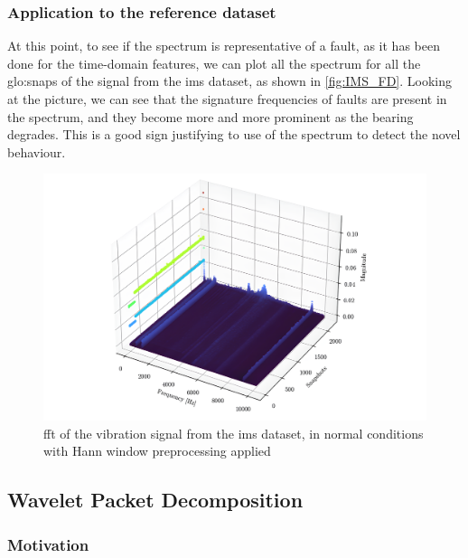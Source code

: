 \subsubsection{Application to the reference dataset}

At this point, to see if the spectrum is representative of a fault, as it has been done for the time-domain features, we can plot all the spectrum for all the \gls{glo:snap}s of the  signal from the \gls{ims} dataset, as shown in \autoref{fig:IMS_FD}. Looking at the picture, we can see that the signature frequencies of faults are present in the spectrum, and they become more and more prominent as the bearing degrades. This is a good sign justifying to use of the spectrum to detect the novel behaviour.

\begin{figure}
    \centering
    \includegraphics[width=\textwidth]{images/FeatureExtraction/FD_IMS.png}
    \caption{\gls{fft} of the  vibration signal from the \gls{ims} dataset, in normal conditions with Hann window preprocessing
    applied}
    \label{fig:IMS_FD}
\end{figure}


\subsection{Wavelet Packet Decomposition}
\label{sec:WPD}

\subsubsection{Motivation}

